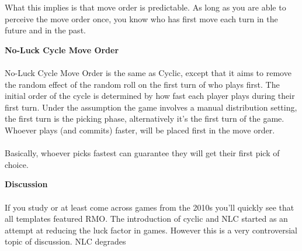What this implies is that move order is predictable. As long as you are able to perceive the move order once, you know who has first move each turn in the future and in the past. 

\textbf{No-Luck Cycle Move Order} \label{noluck_cycle}
\\
\\
No-Luck Cycle Move Order is the same as Cyclic, except that it aims to remove the random effect of the random roll on the first turn of who plays first. The initial order of the cycle is determined by how fast each player plays during their first turn. Under the assumption the game involves a manual distribution setting, the first turn is the picking phase, alternatively it's the first turn of the game. Whoever plays (and commits) faster, will be placed first in the move order.
\\
\\
Basically, whoever picks fastest can guarantee they will get their first pick of choice. 

\textbf{Discussion}
\\
\\
If you study or at least come across games from the 2010s you'll quickly see that all templates featured RMO. The introduction of cyclic and NLC started as an attempt at reducing the luck factor in games. However this is a very controversial topic of discussion. NLC degrades